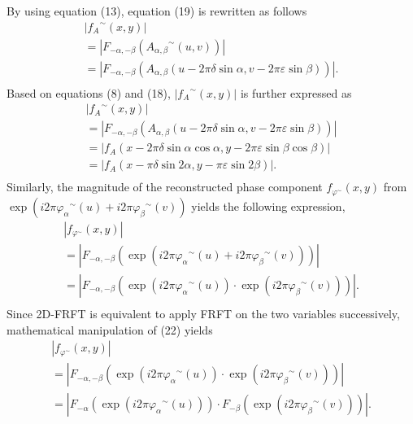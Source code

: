 \documentclass[journal]{IEEEtran}
\begin{document}
By using equation (13), equation (19) is rewritten as follows
\begin{equation}
\begin{array}{l}
 \left| {{f_A}^\sim(x,y)} \right| \\
  = \left| {{F_{ - \alpha , - \beta }}({A_{\alpha ,\beta }}^\sim(u,v))} \right| \\
  = \left| {{F_{ - \alpha , - \beta }}({A_{\alpha ,\beta }}(u - 2\pi \delta \sin \alpha ,v - 2\pi \varepsilon \sin \beta ))} \right|. \\
 \end{array}
\end{equation}
Based on equations (8) and (18), $| {{f_A}^\sim(x,y)}| $ is further expressed as
\begin{equation}
\begin{array}{l}
 \left| {{f_A}^\sim(x,y)} \right| \\
  = \left| {{F_{ - \alpha , - \beta }}({A_{\alpha ,\beta }}(u - 2\pi \delta \sin \alpha ,v - 2\pi \varepsilon \sin \beta ))} \right| \\
  = \left| {{f_A}\left( {x - 2\pi \delta \sin \alpha \cos \alpha ,y - 2\pi \varepsilon \sin \beta \cos \beta } \right)} \right| \\
  = \left| {{f_A}\left( {x - \pi \delta \sin 2\alpha ,y - \pi \varepsilon \sin 2\beta } \right)} \right|. \\
 \end{array}
\end{equation}
Similarly, the magnitude of the reconstructed phase component ${{f_{{\varphi ^\sim}}}(x,y)}$ from $\exp (i2\pi {\varphi _\alpha }^ \sim (u)+ i2\pi {\varphi _\beta }^ \sim (v))$ yields the following expression,
\begin{equation}
\begin{array}{l}
 \left| {{f_{{\varphi ^\sim}}}(x,y)} \right| \\
  = \left| {{F_{ - \alpha , - \beta }}(\exp (i2\pi {\varphi _\alpha }^\sim(u) + i2\pi {\varphi _\beta }^\sim(v)))} \right| \\
  = \left| {{F_{ - \alpha , - \beta }}(\exp (i2\pi {\varphi _\alpha }^\sim(u)) \cdot \exp (i2\pi {\varphi _\beta }^\sim(v)))} \right|. \\
 \end{array}
\end{equation}
Since 2D-FRFT is equivalent to apply FRFT on the two variables successively, mathematical manipulation of (22) yields
\begin{equation}
\begin{array}{l}
 \left| {{f_{{\varphi ^\sim}}}(x,y)} \right| \\
  = \left| {{F_{ - \alpha , - \beta }}(\exp (i2\pi {\varphi _\alpha }^\sim(u)) \cdot \exp (i2\pi {\varphi _\beta }^\sim(v)))} \right| \\
  = \left| {{F_{ - \alpha }}(\exp (i2\pi {\varphi _\alpha }^\sim(u))) \cdot {F_{ - \beta }}(\exp (i2\pi {\varphi _\beta }^\sim(v)))} \right|. \\
 \end{array}
\end{equation}
\end{document}
